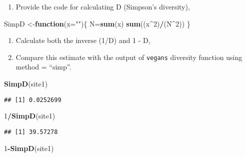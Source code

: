 \documentclass[
]{article}
\newenvironment{Shaded}{\begin{snugshade}}{\end{snugshade}}
\newcommand{\ControlFlowTok}[1]{\textcolor[rgb]{0.13,0.29,0.53}{\textbf{#1}}}
\newcommand{\DataTypeTok}[1]{\textcolor[rgb]{0.13,0.29,0.53}{#1}}
\newcommand{\DecValTok}[1]{\textcolor[rgb]{0.00,0.00,0.81}{#1}}
\newcommand{\KeywordTok}[1]{\textcolor[rgb]{0.13,0.29,0.53}{\textbf{#1}}}
\newcommand{\NormalTok}[1]{#1}
\newcommand{\OperatorTok}[1]{\textcolor[rgb]{0.81,0.36,0.00}{\textbf{#1}}}
\newcommand{\StringTok}[1]{\textcolor[rgb]{0.31,0.60,0.02}{#1}}
\providecommand{\tightlist}{%
  \setlength{\itemsep}{0pt}\setlength{\parskip}{0pt}}
\begin{document}
\begin{enumerate}
\def\labelenumi{\arabic{enumi}.}
\tightlist
\item
  Provide the code for calculating D (Simpson's diversity),
\end{enumerate}

\begin{Shaded}
\begin{Highlighting}[]
\NormalTok{SimpD <-}\ControlFlowTok{function}\NormalTok{(}\DataTypeTok{x=}\StringTok{""}\NormalTok{)\{}
\NormalTok{  N=}\KeywordTok{sum}\NormalTok{(x)}
  \KeywordTok{sum}\NormalTok{((x}\OperatorTok{^}\DecValTok{2}\NormalTok{)}\OperatorTok{/}\NormalTok{(N}\OperatorTok{^}\DecValTok{2}\NormalTok{))}
\NormalTok{\}}
\end{Highlighting}
\end{Shaded}

\begin{enumerate}
\def\labelenumi{\arabic{enumi}.}
\setcounter{enumi}{1}
\item
  Calculate both the inverse (1/D) and 1 - D,
\item
  Compare this estimate with the output of
  \texttt{vegan\textquotesingle{}s} diversity function using method =
  ``simp''.
\end{enumerate}

\begin{Shaded}
\begin{Highlighting}[]
\KeywordTok{SimpD}\NormalTok{(site1)}
\end{Highlighting}
\end{Shaded}

\begin{verbatim}
## [1] 0.0252699
\end{verbatim}

\begin{Shaded}
\begin{Highlighting}[]
\DecValTok{1}\OperatorTok{/}\KeywordTok{SimpD}\NormalTok{(site1)}
\end{Highlighting}
\end{Shaded}

\begin{verbatim}
## [1] 39.57278
\end{verbatim}

\begin{Shaded}
\begin{Highlighting}[]
\DecValTok{1}\OperatorTok{-}\KeywordTok{SimpD}\NormalTok{(site1)}
\end{Highlighting}
\end{Shaded}
\end{document}
